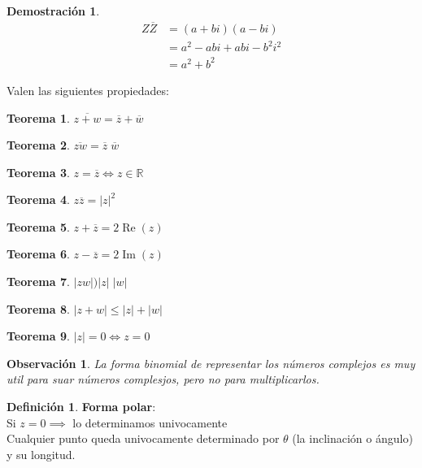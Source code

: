 \documentclass[9pt,a4paper,draft]{article}
\theoremstyle{definition}
\newtheorem{defi}{Definición}
\theoremstyle{plain}
\newtheorem{teo}{Teorema}
\newtheorem{demo}{Demostración}[teo]
\newtheorem{obs}{Observación}
\DeclareMathOperator{\re}{Re}
\DeclareMathOperator{\im}{Im}
\begin{document}
\begin{demo}
\begin{align*}
Z\overline{Z} &= (a+bi)(a-bi)\\
              &= a^2-abi+abi-b^2i^2\\
	      &= a^2+b^2
\end{align*}
\end{demo}

Valen las siguientes propiedades:

\begin{teo} $\overline{z+w} = \overline{z} + \overline{w}$\end{teo}

\begin{teo} $\overline{zw} = \overline{z}\;\overline{w}$\end{teo}

\begin{teo} $z=\overline{z} \iff z\in{\mathbb{R}}$\end{teo}

\begin{teo} $z\overline{z}=|z|^2$\end{teo}

\begin{teo} $z+\overline{z} = 2\re(z)$\end{teo}

\begin{teo} $z-\overline{z} = 2\im(z)$\end{teo}

\begin{teo} $|zw| ) |z|\;|w|$\end{teo}

\begin{teo} $|z+w| \leq |z|+|w|$\end{teo} 

\begin{teo} $|z| = 0 \iff z=0$\end{teo}


\begin{obs}
La forma binomial de representar los números complejos es muy util para suar números complesjos, pero no para multiplicarlos.
\end{obs}

\begin{defi} {\bfseries Forma polar}:\\
Si $z=0\implies$ lo determinamos univocamente\\
Cualquier punto queda univocamente determinado por $\theta$ (la inclinación o ángulo) y su longitud.
\end{defi}
\end{document}
